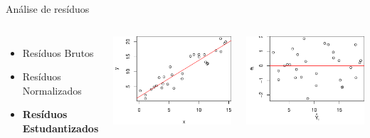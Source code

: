 \documentclass{beamer}\usepackage[]{graphicx}\usepackage[]{color}
\newenvironment{knitrout}{}{} %
\renewenvironment{knitrout}{\setlength{\topsep}{0mm}}{}
\begin{document}
\begin{frame}{Análise de resíduos}

\begin{columns}[t]

\small

\begin{itemize}
\item Resíduos Brutos
\item Resíduos Normalizados
\item \textbf{Resíduos Estudantizados}
\end{itemize}


\begin{knitrout}
\color{fgcolor}
\includegraphics[width=1\linewidth]{figure/studres-1} 

\includegraphics[width=1\linewidth]{figure/studres-2} 

\end{knitrout}
\end{columns}


\end{frame}
\end{document}
